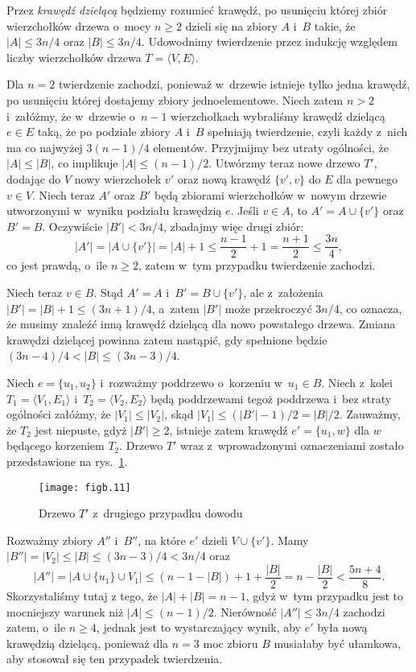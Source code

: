 
\subproblem %
Przez \emph{krawędź dzielącą} będziemy rozumieć krawędź, po usunięciu której zbiór wierzchołków drzewa o~mocy $n\ge2$ dzieli się na zbiory $A$ i~$B$ takie, że $|A|\le3n/4$ oraz $|B|\le3n/4$. Udowodnimy twierdzenie przez indukcję względem liczby wierzchołków drzewa $T=\langle V,E\rangle$.

Dla $n=2$ twierdzenie zachodzi, ponieważ w~drzewie istnieje tylko jedna krawędź, po usunięciu której dostajemy zbiory jednoelementowe. Niech zatem $n>2$ i~załóżmy, że w~drzewie o~$n-1$ wierzchołkach wybraliśmy krawędź dzielącą $e\in E$ taką, że po podziale zbiory $A$ i~$B$ spełniają twierdzenie, czyli każdy z~nich ma co najwyżej $3(n-1)/4$ elementów. Przyjmijmy bez utraty ogólności, że $|A|\le|B|$, co implikuje $|A|\le(n-1)/2$. Utwórzmy teraz nowe drzewo $T'$, dodając do $V$ nowy wierzchołek $v'$ oraz nową krawędź $\{v',v\}$ do $E$ dla pewnego $v\in V$. Niech teraz $A'$ oraz $B'$ będą zbiorami wierzchołków w~nowym drzewie utworzonymi w~wyniku podziału krawędzią $e$. Jeśli $v\in A$, to $A'=A\cup\{v'\}$ oraz $B'=B$. Oczywiście $|B'|<3n/4$, zbadajmy więc drugi zbiór:
\[
	|A'| = \bigl|A\cup\{v'\}\bigr| = |A|+1 \le \frac{n-1}{2}+1 = \frac{n+1}{2} \le \frac{3n}{4},
\]
co jest prawdą, o~ile $n\ge2$, zatem w~tym przypadku twierdzenie zachodzi.

Niech teraz $v\in B$. Stąd $A'=A$ i~$B'=B\cup \{v'\}$, ale z~założenia $|B'|=|B|+1\le(3n+1)/4$, a~zatem $|B'|$ może przekroczyć $3n/4$, co oznacza, że musimy znaleźć inną krawędź dzielącą dla nowo powstałego drzewa. Zmiana krawędzi dzielącej powinna zatem nastąpić, gdy spełnione będzie $(3n-4)/4<|B|\le(3n-3)/4$.

Niech $e=\{u_1,u_2\}$ i~rozważmy poddrzewo o~korzeniu w~$u_1\in B$. Niech z~kolei $T_1=\langle V_1,E_1\rangle$ i~$T_2=\langle V_2,E_2\rangle$ będą poddrzewami tegoż poddrzewa i~bez straty ogólności załóżmy, że $|V_1|\le|V_2|$, skąd $|V_1|\le(|B'|-1)/2=|B|/2$. Zauważmy, że $T_2$ jest niepuste, gdyż $|B'|\ge2$, istnieje zatem krawędź $e'=\{u_1,w\}$ dla $w$ będącego korzeniem $T_2$. Drzewo $T'$ wraz z~wprowadzonymi oznaczeniami zostało przedstawione na rys.~\ref{fig:B-3a}.
\begin{figure}[ht]
	\begin{center}
		\texttt{[image: figb.11]}
	\end{center}
	\caption{Drzewo $T'$ z~drugiego przypadku dowodu} \label{fig:B-3a}
\end{figure}
Rozważmy zbiory $A''$ i~$B''$, na które $e'$ dzieli $V\cup\{v'\}$. Mamy $|B''|=|V_2|\le|B|\le(3n-3)/4<3n/4$ oraz
\[
	|A''| = \bigl|A\cup\{u_1\}\cup V_1\bigr| \le (n-1-|B|)+1+\frac{|B|}{2} = n-\frac{|B|}{2} < \frac{5n+4}{8}.
\]
Skorzystaliśmy tutaj z tego, że $|A|+|B|=n-1$, gdyż w~tym przypadku jest to mocniejszy warunek niż $|A|\le(n-1)/2$. Nierówność $|A''|\le3n/4$ zachodzi zatem, o~ile $n\ge4$, jednak jest to wystarczający wynik, aby $e'$ była nową krawędzią dzielącą, ponieważ dla $n=3$ moc zbioru $B$ musiałaby być ułamkowa, aby stosował się ten przypadek twierdzenia.

